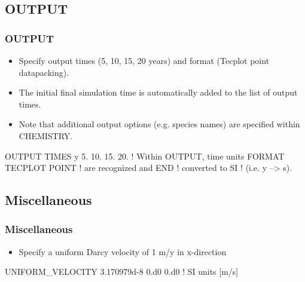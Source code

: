 \documentclass{beamer}
\newcommand\redcomment[1]{{{\color{red} #1}}}
\newcommand\bluecomment[1]{{{\color{blue} #1}}}
\newcommand\greencomment[1]{{{\color{green} #1}}}
\begin{document}
\subsection{OUTPUT}

\begin{frame}[fragile]\frametitle{OUTPUT}

\begin{itemize}
\item Specify output times (5, 10, 15, 20 years) and format (Tecplot point datapacking).
\item The initial final simulation time is automatically added to the list of output times.
\item Note that additional output options (e.g. species names) are specified within CHEMISTRY.
\end{itemize}


\begin{semiverbatim}

OUTPUT
  TIMES \redcomment{y} 5. 10. 15. 20.  \bluecomment{! Within OUTPUT, time units}
  FORMAT TECPLOT POINT    \bluecomment{! are recognized and}
END                       \bluecomment{! converted to SI}
                          \bluecomment{! (i.e. \redcomment{y} --> \greencomment{s}).}
\end{semiverbatim}

\end{frame}

\subsection{Miscellaneous}

\begin{frame}[fragile]\frametitle{Miscellaneous}

\begin{itemize}
\item Specify a uniform Darcy velocity of 1 m/y in x-direction
\end{itemize}


\begin{semiverbatim}

UNIFORM_VELOCITY 3.170979d-8 0.d0 0.d0  \bluecomment{! SI units [m/s]}
\end{semiverbatim}

\end{frame}
\end{document}
